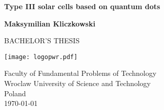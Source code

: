 \begin{titlepage}
   \begin{center}
       \vspace*{1cm}
 
       \textbf{\huge Type III solar cells based on quantum dots}
 
       \vspace{1.5cm}
 
       \textbf{Maksymilian Kliczkowski}
 
       \vfill
  	   
 	   \Large BACHELOR'S THESIS

       \vspace{0.8cm}
 
       \texttt{[image: logopwr.pdf]}
 
       Faculty of Fundamental Problems of Technology\\
       Wroclaw University of Science and Technology\\
       Poland\\
       \today
 
   \end{center}
\end{titlepage}